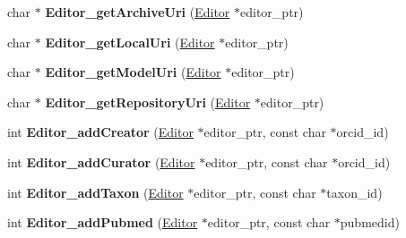 \begin{DoxyCompactItemize}
\item 
\mbox{\label{namespaceomexmeta_ad0a68ce47a12363204bde49b838cd5d0}} 
char $\ast$ {\bfseries Editor\+\_\+get\+Archive\+Uri} (\hyperlink{classomexmeta_1_1Editor}{Editor} $\ast$editor\+\_\+ptr)
\item 
\mbox{\label{namespaceomexmeta_a28c678eeb0c4457bbbd671eb2dac73d0}} 
char $\ast$ {\bfseries Editor\+\_\+get\+Local\+Uri} (\hyperlink{classomexmeta_1_1Editor}{Editor} $\ast$editor\+\_\+ptr)
\item 
\mbox{\label{namespaceomexmeta_aaddb4c2e6bc636650b20c2eb526ff691}} 
char $\ast$ {\bfseries Editor\+\_\+get\+Model\+Uri} (\hyperlink{classomexmeta_1_1Editor}{Editor} $\ast$editor\+\_\+ptr)
\item 
\mbox{\label{namespaceomexmeta_afc5399a7743a7ddbb79a903ca5676170}} 
char $\ast$ {\bfseries Editor\+\_\+get\+Repository\+Uri} (\hyperlink{classomexmeta_1_1Editor}{Editor} $\ast$editor\+\_\+ptr)
\item 
\mbox{\label{namespaceomexmeta_a7b612eade9eb34450ea88ef85657c838}} 
int {\bfseries Editor\+\_\+add\+Creator} (\hyperlink{classomexmeta_1_1Editor}{Editor} $\ast$editor\+\_\+ptr, const char $\ast$orcid\+\_\+id)
\item 
\mbox{\label{namespaceomexmeta_a86cf5fb8f670b0b648162ddfbe5d8a02}} 
int {\bfseries Editor\+\_\+add\+Curator} (\hyperlink{classomexmeta_1_1Editor}{Editor} $\ast$editor\+\_\+ptr, const char $\ast$orcid\+\_\+id)
\item 
\mbox{\label{namespaceomexmeta_a5f46902a5da35486989b7e74c42c451a}} 
int {\bfseries Editor\+\_\+add\+Taxon} (\hyperlink{classomexmeta_1_1Editor}{Editor} $\ast$editor\+\_\+ptr, const char $\ast$taxon\+\_\+id)
\item 
\mbox{\label{namespaceomexmeta_a8a2613943915dc228a4b53de2423ba62}} 
int {\bfseries Editor\+\_\+add\+Pubmed} (\hyperlink{classomexmeta_1_1Editor}{Editor} $\ast$editor\+\_\+ptr, const char $\ast$pubmedid)
\item 
\mbox{\label{namespaceomexmeta_a117e6430247224600755a3c3bffb0632}} 

\end{DoxyCompactItemize}

